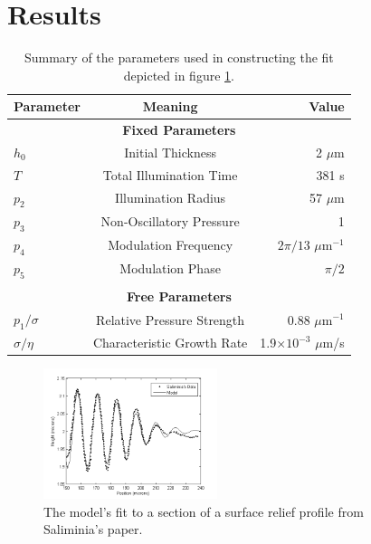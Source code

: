 \documentclass[twocolumn,showpacs,preprintnumbers,amsmath,amssymb]{revtex4}
\begin{document}
\section{Results}
\begin{table}
  \begin{ruledtabular}
                                \begin{tabular}{l c r}
                                  \textbf{Parameter}&\textbf{Meaning}&\textbf{Value}\\
                                  \hline
                                  \multicolumn{3}{c}{\textbf{Fixed Parameters}}\\
                                  $h_0$& Initial Thickness&2 $\mu$m\\
                                  $T$& Total Illumination Time&381 s\\
                                  $p_2$&Illumination Radius&57 $\mu$m\\
                                  $p_3$&Non-Oscillatory Pressure&1\\
                                  $p_4$&Modulation Frequency&$2\pi/13$ $\mu$m$^{-1}$\\
                                  $p_5$&Modulation Phase&$\pi/2$\\
                                  \\
                                  \multicolumn{3}{c}{\textbf{Free Parameters}}\\
                                  $p_1/\sigma$&Relative Pressure Strength&0.88 $\mu$m$^{-1}$\\
                                  $\sigma/\eta$&Characteristic Growth Rate&1.9$\times 10^{-3}$ $\mu$m/s\\
                                \end{tabular}
  \end{ruledtabular}
  \caption{Summary of the parameters used in constructing the fit depicted in figure
                                \ref{fig:sinemodzoom}.} \label{tab:sinemod}
\end{table}

\begin{figure}[!htbp]
  \includegraphics[width=2in]{figure/sinefigurezoom.png}
  \caption{The model's fit to a section of a surface relief profile from Saliminia's paper.}
  \label{fig:sinemodzoom}
\end{figure}
\end{document}
